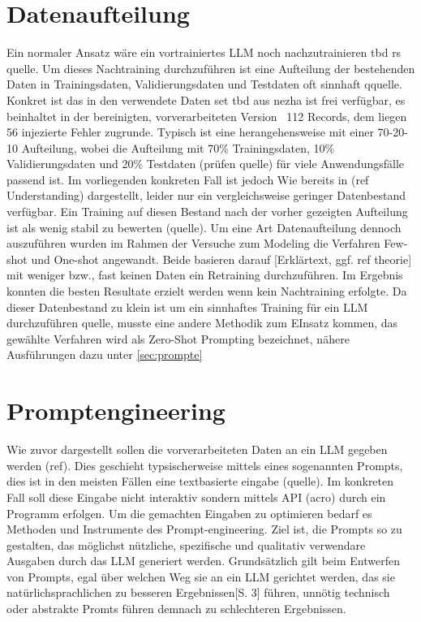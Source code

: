 \section{Datenaufteilung}
\label{sec:datasplit}
Ein normaler Ansatz wäre ein vortrainiertes LLM noch nachzutrainieren tbd rs quelle. Um dieses Nachtraining durchzuführen ist eine Aufteilung der bestehenden Daten in Trainingsdaten, Validierungsdaten und Testdaten oft sinnhaft qquelle. Konkret ist das in den verwendete Daten set tbd aus nezha ist frei verfügbar, es beinhaltet in der bereinigten, vorverarbeiteten Version ~112 Records, dem liegen 56 injezierte Fehler zugrunde. Typisch ist eine herangehensweise mit einer 70-20-10 Aufteilung, wobei die Aufteilung mit 70\% Trainingsdaten, 10\% Validierungsdaten und  20\% Testdaten (prüfen quelle) für viele Anwendungsfälle passend ist. Im vorliegenden konkreten Fall ist jedoch Wie bereits in  (ref Understanding) dargestellt, leider nur ein vergleichsweise geringer Datenbestand verfügbar. Ein Training auf diesen Bestand nach der vorher gezeigten Aufteilung ist als wenig stabil zu bewerten (quelle). Um eine Art Datenaufteilung dennoch auszuführen wurden im Rahmen der Versuche zum Modeling die Verfahren Few-shot und One-shot angewandt. Beide basieren darauf [Erklärtext, ggf. ref theorie] mit weniger bzw., fast keinen Daten ein Retraining durchzuführen. Im Ergebnis konnten die besten Resultate erzielt werden wenn kein Nachtraining erfolgte. Da dieser Datenbestand zu klein ist um ein sinnhaftes Training für ein LLM durchzuführen quelle, musste eine andere Methodik zum EInsatz kommen, das gewählte Verfahren wird als Zero-Shot Prompting bezeichnet, nähere Ausführungen dazu unter \autoref{sec:prompte}
 

\section{Promptengineering}
\label{sec:prompte}
Wie zuvor dargestellt sollen die vorverarbeiteten Daten an ein LLM gegeben werden (ref). Dies geschieht typsischerweise mittels eines sogenannten Prompts, dies ist in den meisten Fällen eine textbasierte eingabe (quelle). Im konkreten Fall soll diese Eingabe nicht interaktiv sondern mittels API (acro) durch ein Programm erfolgen. Um die gemachten Eingaben zu optimieren bedarf es Methoden und Instrumente des Prompt-engineering. Ziel ist, die Prompts so zu gestalten, das möglichst nützliche, spezifische und qualitativ verwendare Ausgaben durch das LLM generiert werden. Grundsätzlich gilt beim Entwerfen von Prompts, egal über welchen Weg sie an ein LLM gerichtet werden, das sie natürlichsprachlichen zu besseren Ergebnissen\autocite{Brown2020}[S. 3] führen, unnötig technisch oder abstrakte Promts führen demnach zu schlechteren Ergebnissen. 

